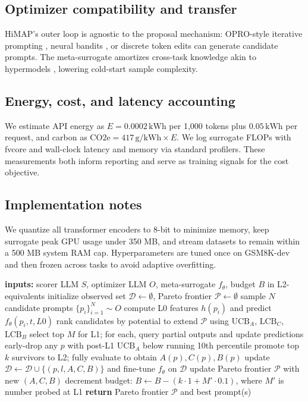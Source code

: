 \documentclass{article}
\begin{document}
\subsection{Optimizer compatibility and transfer}
HiMAP's outer loop is agnostic to the proposal mechanism: OPRO-style iterative prompting \cite{yang-2023-large}, neural bandits \cite{lin-2023-use}, or discrete token edits \cite{wen-2023-hard} can generate candidate prompts. The meta-surrogate amortizes cross-task knowledge akin to hypermodels \cite{phang-2022-hypertuning}, lowering cold-start sample complexity.

\subsection{Energy, cost, and latency accounting}
We estimate API energy as \(E = 0.0002\,\mathrm{kWh}\) per 1,000 tokens plus \(0.05\,\mathrm{kWh}\) per request, and carbon as \(\mathrm{CO2e} = 417\,\mathrm{g}/\mathrm{kWh} \times E\). We log surrogate FLOPs with fvcore and wall-clock latency and memory via standard profilers. These measurements both inform reporting and serve as training signals for the cost objective.

\subsection{Implementation notes}
We quantize all transformer encoders to 8-bit to minimize memory, keep surrogate peak GPU usage under 350 MB, and stream datasets to remain within a 500 MB system RAM cap. Hyperparameters are tuned once on GSM8K-dev and then frozen across tasks to avoid adaptive overfitting.

\begin{algorithm}
\caption{HiMAP outer loop with multi-fidelity acquisition}
\begin{algorithmic}[1]
\State \textbf{inputs:} scorer LLM \(S\), optimizer LLM \(O\), meta-surrogate \(f_{\theta}\), budget \(B\) in L2-equivalents
\State initialize observed set \(\mathcal{D} \leftarrow \emptyset\), Pareto frontier \(\mathcal{P} \leftarrow \emptyset\)
  \State sample \(N\) candidate prompts \(\{p_i\}_{i=1}^{N} \sim O\)
    \State compute L0 features \(h(p_i)\) and predict \(f_{\theta}(p_i, t, L0)\)
  \EndFor
  \State rank candidates by potential to extend \(\mathcal{P}\) using \(\mathrm{UCB}_A\), \(\mathrm{LCB}_C\), \(\mathrm{LCB}_B\)
  \State select top \(M\) for L1; for each, query partial outputs and update predictions
  \State early-drop any \(p\) with post-L1 \(\mathrm{UCB}_A\) below running 10th percentile
  \State promote top \(k\) survivors to L2; fully evaluate to obtain \(A(p), C(p), B(p)\)
  \State update \(\mathcal{D} \leftarrow \mathcal{D} \cup \{(p, l, A, C, B)\}\) and fine-tune \(f_{\theta}\) on \(\mathcal{D}\)
  \State update Pareto frontier \(\mathcal{P}\) with new \((A, C, B)\)
  \State decrement budget: \(B \leftarrow B - (k \cdot 1 + M' \cdot 0.1)\), where \(M'\) is number probed at L1
\EndWhile
\State \textbf{return} Pareto frontier \(\mathcal{P}\) and best prompt(s)
\end{algorithmic}
\end{algorithm}
\end{document}
